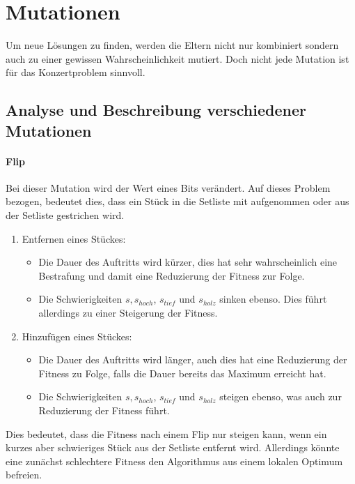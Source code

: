 \section{Mutationen}\label{sec:mutation}
Um neue Lösungen zu finden, werden die Eltern nicht nur kombiniert sondern auch zu
einer gewissen Wahrscheinlichkeit mutiert. Doch nicht jede Mutation ist für das Konzertproblem 
sinnvoll. 
\subsection{Analyse und Beschreibung verschiedener Mutationen}
\paragraph{Flip}
Bei dieser Mutation wird der Wert eines Bits verändert. Auf dieses Problem bezogen, 
bedeutet dies, dass ein Stück in die Setliste mit aufgenommen oder aus 
der Setliste gestrichen wird. 
\begin{enumerate}
    \item Entfernen eines Stückes: 
    \begin{itemize}
        \item Die Dauer des Auftritts wird kürzer, dies hat sehr wahrscheinlich eine Bestrafung und 
            damit eine Reduzierung der Fitness zur Folge. 
        \item Die Schwierigkeiten $s, s_{hoch}$, $ s_{tief}$ und $s_{holz}$ sinken ebenso. Dies führt allerdings 
            zu einer Steigerung der Fitness. 
    \end{itemize}
    \item Hinzufügen eines Stückes:
    \begin{itemize}
        \item Die Dauer des Auftritts wird länger, auch dies hat eine Reduzierung der Fitness zu Folge, falls die Dauer bereits das Maximum erreicht hat.
        \item Die Schwierigkeiten $s, s_{hoch}$, $ s_{tief}$ und $s_{holz}$ steigen ebenso, was auch zur Reduzierung 
            der Fitness führt. 
    \end{itemize}
\end{enumerate}
Dies bedeutet, dass die Fitness nach einem Flip nur steigen kann, wenn ein kurzes aber schwieriges Stück aus 
der Setliste entfernt wird. Allerdings könnte eine zunächst schlechtere Fitness den Algorithmus aus 
einem lokalen Optimum befreien.

